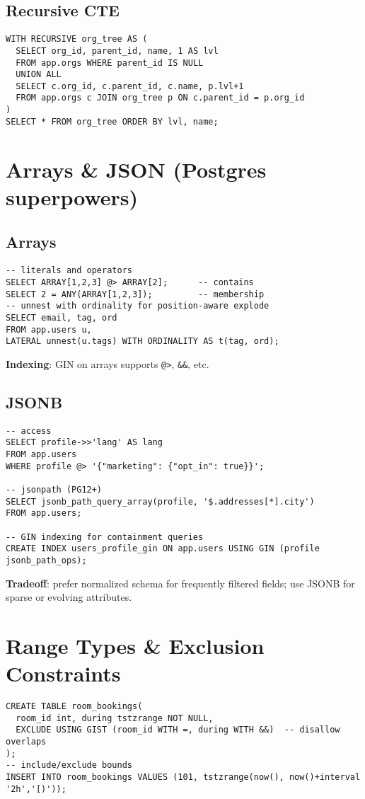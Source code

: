 \documentclass[10pt]{article}
\begin{document}
\subsection{Recursive CTE}
\begin{lstlisting}[style=psql]
WITH RECURSIVE org_tree AS (
  SELECT org_id, parent_id, name, 1 AS lvl
  FROM app.orgs WHERE parent_id IS NULL
  UNION ALL
  SELECT c.org_id, c.parent_id, c.name, p.lvl+1
  FROM app.orgs c JOIN org_tree p ON c.parent_id = p.org_id
)
SELECT * FROM org_tree ORDER BY lvl, name;
\end{lstlisting}

\section{Arrays \& JSON (Postgres superpowers)}
\subsection{Arrays}
\begin{lstlisting}[style=psql]
-- literals and operators
SELECT ARRAY[1,2,3] @> ARRAY[2];      -- contains
SELECT 2 = ANY(ARRAY[1,2,3]);         -- membership
-- unnest with ordinality for position-aware explode
SELECT email, tag, ord
FROM app.users u,
LATERAL unnest(u.tags) WITH ORDINALITY AS t(tag, ord);
\end{lstlisting}
\textbf{Indexing}: GIN on arrays supports \texttt{@>}, \texttt{\&\&}, etc.

\subsection{JSONB}
\begin{lstlisting}[style=psql]
-- access
SELECT profile->>'lang' AS lang
FROM app.users
WHERE profile @> '{"marketing": {"opt_in": true}}';

-- jsonpath (PG12+)
SELECT jsonb_path_query_array(profile, '$.addresses[*].city')
FROM app.users;

-- GIN indexing for containment queries
CREATE INDEX users_profile_gin ON app.users USING GIN (profile jsonb_path_ops);
\end{lstlisting}
\textbf{Tradeoff}: prefer normalized schema for frequently filtered fields; use JSONB for sparse or evolving attributes.

\section{Range Types \& Exclusion Constraints}
\begin{lstlisting}[style=psql]
CREATE TABLE room_bookings(
  room_id int, during tstzrange NOT NULL,
  EXCLUDE USING GIST (room_id WITH =, during WITH &&)  -- disallow overlaps
);
-- include/exclude bounds
INSERT INTO room_bookings VALUES (101, tstzrange(now(), now()+interval '2h','[)'));
\end{lstlisting}
\end{document}

